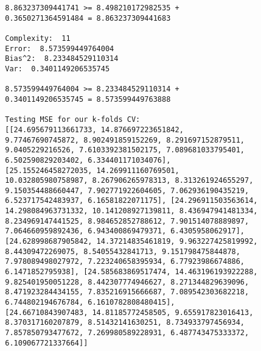 \begin{verbatim}
        8.863237309441741 >= 8.498210172982535 +
        0.3650271364591484 = 8.863237309441683
        
        Complexity:  11
        Error:  8.573599449764004
        Bias^2:  8.233484529110314
        Var:  0.3401149206535745
        
        8.573599449764004 >= 8.233484529110314 +
        0.3401149206535745 = 8.573599449763888
        
        Testing MSE for our k-folds CV:  
        [[24.695679113661733, 14.876697223651842,
        9.77467690745872, 8.902491859152269, 8.291697152879511,
        9.0405229216526, 7.6103392381502175, 7.089681033795401,
        6.502590829203402, 6.334401171034076],
        [25.155246458272035, 14.269911160769501,
        10.032805980758987, 8.267906265978313, 8.313261924655297,
        9.150354488660447, 7.902771922604605, 7.062936190435219,
        6.523717542483937, 6.16581822071175], [24.296911503563614,
        14.298084963731332, 10.141208927139811, 8.436947941481334,
        8.234969147441525, 8.984652852788612, 7.901514078889897,
        7.064660959892436, 6.943400869479371, 6.4305958062917],
        [24.628998687905842, 14.37214835461819, 9.963227425819992,
        8.44309472269075, 8.54055432841713, 9.151798475844878,
        7.978089498027972, 7.223240658395934, 6.77923986674886,
        6.1471852795938], [24.585683869517474, 14.463196193922288,
        9.825401950051228, 8.442307774946627, 8.271344829639096,
        8.471923284434155, 7.835216915666687, 7.089542303682218,
        6.744802194676784, 6.1610782808480415],
        [24.66710843907483, 14.81185772458505, 9.655917823016413,
        8.370317160207879, 8.51432141630251, 8.734933797456934,
        7.857850793477672, 7.269980589228931, 6.487743475333372,
        6.109067721337664]]
\end{verbatim}
